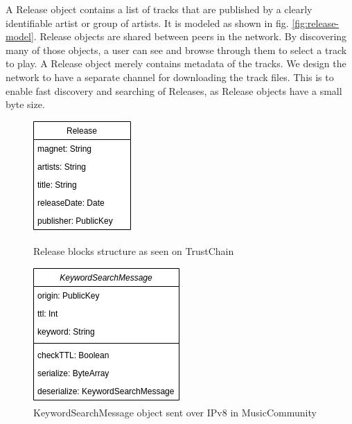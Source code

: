 A Release object contains a list of tracks that are published by a clearly identifiable artist or group of artists. It is modeled as shown in fig. \ref{fig:release-model}. Release objects are shared between peers in the network. By discovering many of those objects, a user can see and browse through them to select a track to play. A Release object merely contains metadata of the tracks. We design the network to have a separate channel for downloading the track files. This is to enable fast discovery and searching of Releases, as Release objects have a small byte size. 
\begin{figure}
        \centering
        \includegraphics[width=0.5\linewidth]{design/release-model.png}
        \caption{Release blocks structure as seen on TrustChain}
        \label{fig:release-model}
    \endminipage\hfill
        \centering
        \includegraphics[width=0.6\linewidth]{design/KeywordSearchMessage-model.png}
        \caption{KeywordSearchMessage object sent over IPv8 in MusicCommunity}
        \label{fig:keyword-search-message-model}
    \endminipage
\end{figure}

